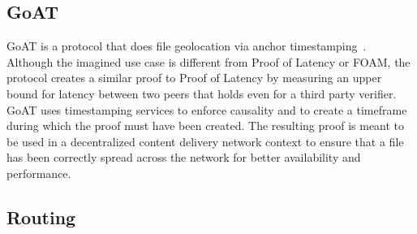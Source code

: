\subsection{GoAT}
GoAT is a protocol that does file geolocation via anchor timestamping~\cite{Maram_undated-it}. Although the imagined use case is different from Proof of Latency or FOAM, the protocol creates a similar proof to Proof of Latency by measuring an upper bound for latency between two peers that holds even for a third party verifier. GoAT uses timestamping services to enforce causality and to create a timeframe during which the proof must have been created. The resulting proof is meant to be used in a decentralized content delivery network context to ensure that a file has been correctly spread across the network for better availability and performance.

\subsection{Routing}
